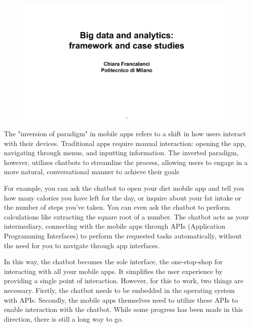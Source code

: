 \begin{figure}[!h]
  \centering
  \includegraphics[page=13, trim = 1.5cm 1.7cm 1.5cm 3.5cm, clip, width=\imagewidth]{images/06 - BIG_DATA.pdf}
\end{figure}

The "inversion of paradigm" in mobile apps refers to a shift in how users interact with their devices. Traditional apps require manual interaction: opening the app, navigating through menus, and inputting information. The inverted paradigm, however, utilizes chatbots to streamline the process, allowing users to engage in a more natural, conversational manner to achieve their goals

For example, you can ask the chatbot to open your diet mobile app and
tell you how many calories you have left for the day, or inquire about
your fat intake or the number of steps you've taken. You can even ask
the chatbot to perform calculations like extracting the square root of a
number. The chatbot acts as your intermediary, connecting with the
mobile apps through APIs (Application Programming Interfaces) to perform
the requested tasks automatically, without the need for you to navigate
through app interfaces.

In this way, the chatbot becomes the sole interface, the one-stop-shop
for interacting with all your mobile apps. It simplifies the user
experience by providing a single point of interaction. However, for this
to work, two things are necessary. Firstly, the chatbot needs to be
embedded in the operating system with APIs. Secondly, the mobile apps
themselves need to utilize these APIs to enable interaction with the
chatbot. While some progress has been made in this direction, there is
still a long way to go.

